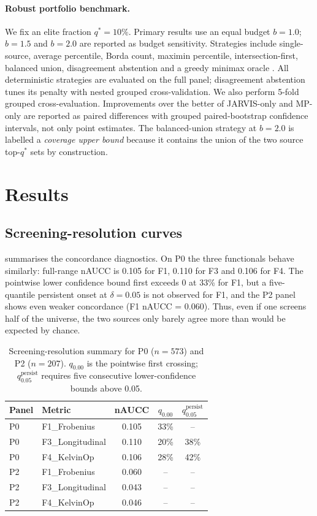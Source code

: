 \documentclass[11pt]{article}
\newcommand{\PZeroFOneNaucc}{0.105}
\newcommand{\PZeroFOneQZero}{33\%}
\newcommand{\PZeroFOnePersistFive}{--}
\newcommand{\PZeroFThreeNaucc}{0.110}
\newcommand{\PZeroFFourNaucc}{0.106}
\newcommand{\PTwoFOneNaucc}{0.060}
\begin{document}
\paragraph{Robust portfolio benchmark.}
We fix an elite fraction $q^*=10\%$.
Primary results use an equal budget $b=1.0$; $b=1.5$ and $b=2.0$ are reported as budget sensitivity.
Strategies include single-source, average percentile, Borda count, maximin percentile, intersection-first, balanced union, disagreement abstention and a greedy minimax oracle \cite{dwork2001,clemen1986}.
All deterministic strategies are evaluated on the full panel; disagreement abstention tunes its penalty with nested grouped cross-validation.
We also perform 5-fold grouped cross-evaluation.
Improvements over the better of JARVIS-only and MP-only are reported as paired differences with grouped paired-bootstrap confidence intervals, not only point estimates.
The balanced-union strategy at $b=2.0$ is labelled a \emph{coverage upper bound} because it contains the union of the two source top-$q^*$ sets by construction.

\section{Results}
\label{sec:results}
\subsection{Screening-resolution curves}
 summarises the concordance diagnostics.
On P0 the three functionals behave similarly: full-range nAUCC is \PZeroFOneNaucc{} for F1, \PZeroFThreeNaucc{} for F3 and \PZeroFFourNaucc{} for F4.
The pointwise lower confidence bound first exceeds 0 at \PZeroFOneQZero{} for F1, but a five-quantile persistent onset at $\delta=0.05$ is not observed for F1, and the P2 panel shows even weaker concordance (F1 nAUCC = \PTwoFOneNaucc{}).
Thus, even if one screens half of the universe, the two sources only barely agree more than would be expected by chance.

\begin{table}[htbp]
\centering
\caption{Screening-resolution summary for P0 ($n=573$) and P2 ($n=207$). $q_{0.00}$ is the pointwise first crossing; $q_{0.05}^{\mathrm{persist}}$ requires five consecutive lower-confidence bounds above 0.05.}
\label{tab:concordance}
\begin{tabular}{llccc}
\toprule
Panel & Metric & nAUCC & $q_{0.00}$ & $q_{0.05}^{\mathrm{persist}}$ \\
\midrule
P0 & F1\_Frobenius & \PZeroFOneNaucc{} & \PZeroFOneQZero{} & \PZeroFOnePersistFive{} \\
P0 & F3\_Longitudinal & \PZeroFThreeNaucc{} & 20\% & 38\% \\
P0 & F4\_KelvinOp & \PZeroFFourNaucc{} & 28\% & 42\% \\
P2 & F1\_Frobenius & \PTwoFOneNaucc{} & -- & -- \\
P2 & F3\_Longitudinal & 0.043 & -- & -- \\
P2 & F4\_KelvinOp & 0.046 & -- & -- \\
\bottomrule
\end{tabular}
\end{table}
\end{document}
